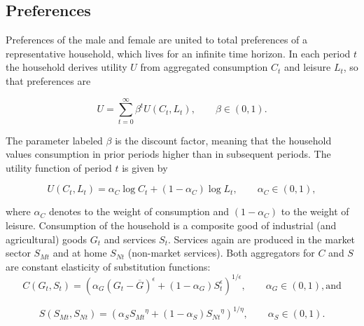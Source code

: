 \documentclass[a4paper,12pt]{article}
\begin{document}
\subsection{Preferences}

Preferences of the male and female are united to total preferences of a representative household, which
lives for an infinite time horizon. In each period $t$ the household derives utility $U$ from aggregated consumption $C_t$ and leisure $L_t$, so that preferences are 

\begin{equation}
\label{Usum}
U=\sum_{t=0}^\infty \beta^t U(C_t, L_t), \qquad \beta \in (0,1).
 \end{equation} 

The parameter labeled $\beta $ is the discount factor, meaning that the household values consumption in prior periods higher than in subsequent periods. The utility function of period $t$ is given by
 
\begin{equation}
\label{U}
U(C_t, L_t)=\alpha_C \log C_t +  (1-\alpha_C) \log L_t, \qquad \alpha_C \in (0,1),
 \end{equation} 

where $\alpha_C$ denotes to the weight of consumption and $(1-\alpha_C)$ to the weight of leisure. Consumption of the household is a composite good of industrial (and agricultural) goods $G_t$  and services $S_t$. Services again are produced in the market sector $S_{Mt}$ and at home  $S_{Nt}$ (non-market services). Both aggregators for $C$ and $S$ are constant elasticity of substitution functions:
\begin{equation}
\label{C} 
C(G_t,S_t)=(\alpha_G (G_t - \overline{G})^\epsilon + (1-\alpha_G) S_t  ^\epsilon)^{1/\epsilon}, \qquad \alpha_G \in (0,1), \text{and}
\end{equation}

\begin{equation}
\label{S} 
S(S_{Mt}, S_{Nt})=(\alpha_S {S_{Mt}}^\eta + (1-\alpha_S) {S_{Nt}}^\eta )^{1/\eta}, \qquad \alpha_S \in (0,1).
\end{equation}
\end{document}
